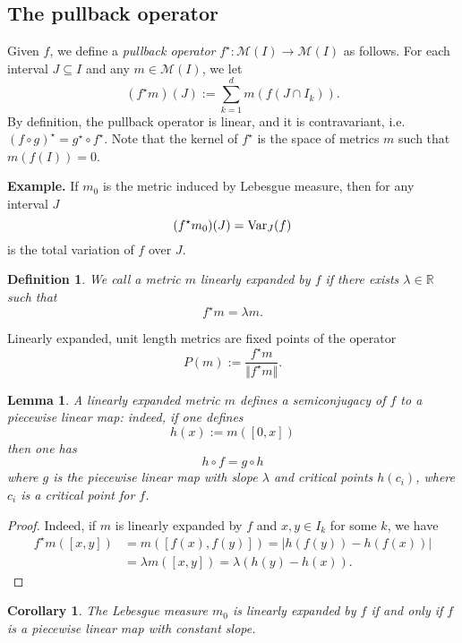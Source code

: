 \documentclass[11pt]{amsart}
\newtheorem{corollary}[theorem]{Corollary}
\newtheorem{lemma}[theorem]{Lemma}
\newtheorem{definition}[theorem]{Definition}
\begin{document}
\subsection{The pullback operator}
Given $f$, we define a \emph{pullback operator} $f^\star : \mathcal{M}(I) \to \mathcal{M}(I)$ as follows.
For each interval $J \subseteq I$ and any $m \in \mathcal{M}(I)$, we let
$$(f^\star m)(J) := \sum_{k=1}^d m(f (J \cap I_k)).$$
By definition, the pullback operator is linear, and it is contravariant, i.e. $(f \circ g)^\star = g^\star \circ f^\star$.
Note that the kernel of $f^\star$ is the space of metrics $m$ such that $m(f(I))= 0$.

\medskip
\noindent \textbf{Example.} If $m_0$ is the metric induced by Lebesgue measure, then for any interval $J$ 
\begin{equation} \label{E:var}
(f^\star m_0)(J) = \textup{Var}_J (f)
\end{equation}
is the total variation of $f$ over $J$.

\begin{definition}
We call a metric $m$ \emph{linearly expanded} by $f$ if there exists $\lambda \in \mathbb{R}$ such that 
$$f^\star m = \lambda m.$$
\end{definition}

\noindent Linearly expanded, unit length metrics are fixed points of the operator
$$P(m) := \frac{f^\star m}{\Vert f^\star m \Vert}.$$

\begin{lemma} \label{L:semiconj}
A linearly expanded metric $m$ defines a semiconjugacy of $f$ to a piecewise linear map: indeed, if one defines 
$$h(x) := m([0, x])$$
then one has 
$$h \circ f = g \circ h$$
where $g$ is the piecewise linear map with slope $\lambda$ and 
critical points $h(c_i)$, where $c_i$ is a critical point for $f$.
\end{lemma}

\begin{proof}
Indeed, if $m$ is linearly expanded by $f$ and $x,y \in I_k$ for some $k$, we have 
\begin{align*}
f^\star m([x,y]) & = m([f(x), f(y)]) = | h(f(y))- h(f(x)) | \\
& = \lambda m([x,y]) = \lambda(h(y) - h(x)).
\end{align*}
\end{proof}

\begin{corollary}
The Lebesgue measure $m_0$ is linearly expanded by $f$ if and only if $f$ is a piecewise linear map with constant slope.
\end{corollary}
\end{document}
